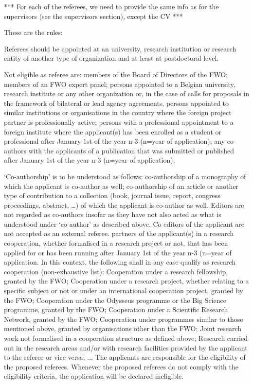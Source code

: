 \documentclass[11pt,dvipsnames,usenames,a4paper]{article}
\begin{document}
*** For each of the referees, we need to provide the same info as for the supervisors (see the supervisors section), except the CV ***

{\color{Gray}
These are the rules:

Referees should be appointed at an university, research institution or research entity of another type of organization and at least at postdoctoral level.

Not eligible as referee are:
members of the Board of Directors of the FWO;
members of an FWO expert panel;
persons appointed to a Belgian university, research institute or any other organization or, in the case of calls for proposals in the framework of bilateral or lead agency agreements, persons appointed to similar institutions or organisations in the country where the foreign project partner is professionally active;
persons with a professional appointment to a foreign institute where the applicant(s) has been enrolled as a student or professional after January 1st of the year n-3 (n=year of application);
any co-authors with the applicants of a publication that was submitted or published after January 1st of the year n-3 (n=year of application); 

‘Co-authorship’ is to be understood as follows:
co-authorship of a monography of which the applicant is co-author as well;
co-authorship of an article or another type of contribution to a collection (book, journal issue, report, congress proceedings, abstract, …) of which the applicant is co-author as well.
Editors are not regarded as co-authors insofar as they have not also acted as what is understood under ‘co-author’ as described above. Co-editors of the applicant are not accepted as an external referee.
partners of the applicant(s) in a research cooperation, whether formalised in a research project or not, that has been applied for or has been running after January 1st of the year n-3 (n=year of application. In this context, the following shall in any case qualify as research cooperation (non-exhaustive list):
Cooperation under a research fellowship, granted by the FWO;
Cooperation under a research project, whether relating to a specific subject or not or under an international cooperation project, granted by the FWO;
Cooperation under the Odysseus programme or the Big Science programme, granted by the FWO;
Cooperation under a Scientific Research Network, granted by the FWO;
Cooperation under programmes similar to those mentioned above, granted by organisations other than the FWO;
Joint research work not formalised in a cooperation structure as defined above;
Research carried out in the research areas and/or with research facilities provided by the applicant to the referee or vice versa;
...
The applicants are responsible for the eligibility of the proposed referees. Whenever the proposed referees do not comply with the eligibility criteria, the application will be declared ineligible.

}
\end{document}
